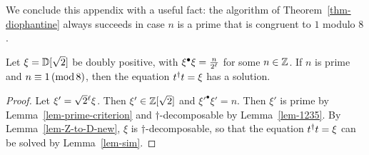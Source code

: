 We conclude this appendix with a useful fact: the algorithm of
Theorem~\ref{thm-diophantine} always succeeds in case $n$ is a prime
that is congruent to $1$ modulo $8$.

\begin{proposition}\label{prop-prime-1mod8}
  Let $\xi={\mathbb{D}}[\sqrt 2]$ be doubly positive, with $\xi^{\bullet}\xi=
  \frac{n}{2^\ell}$ for some $n\in\mathbb{Z}$. If $n$ is prime and $n\equiv
  1\,(\mathop{{\rm mod}}8)$, then the equation $t^{\dagger} t=\xi$ has a solution.
\end{proposition}

\begin{proof}
  Let $\xi'={\sqrt{2}{}^{\ell}}\xi$. Then $\xi'\in\mathbb{Z}[\sqrt 2]$ and
  $\xi'^{\bullet}\xi'=n$. Then $\xi'$ is prime by
  Lemma~\ref{lem-prime-criterion} and $\dagger$-decomposable by
  Lemma~\ref{lem-1235}. By Lemma~\ref{lem-Z-to-D-new}, $\xi$ is
  $\dagger$-decomposable, so that the equation $t^{\dagger} t=\xi$ can be
  solved by Lemma~\ref{lem-sim}.
\end{proof}
